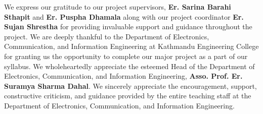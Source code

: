 We express our gratitude to our project supervisors, \textbf{Er. Sarina Barahi Sthapit} and \textbf{Er. Puspha Dhamala} along with our project coordinator\textbf{ Er. Sujan Shrestha} for providing invaluable support and guidance throughout the project. We are deeply thankful to the Department of Electronics, Communication, and Information Engineering at Kathmandu Engineering College for granting us the opportunity to complete our major project as a part of our syllabus. We wholeheartedly appreciate the esteemed Head of the Department of Electronics, Communication, and Information Engineering, \textbf{Asso. Prof. Er. Suramya Sharma Dahal}. We sincerely appreciate the encouragement, support, constructive criticism, and guidance provided by the entire teaching staff at the Department of Electronics, Communication, and Information Engineering.